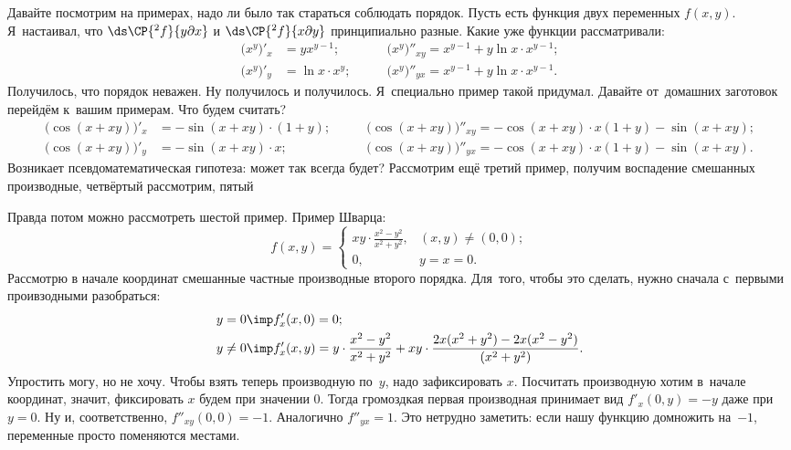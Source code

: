 \documentclass[a4paper,10pt,twoside]{article}
\begin{document}
	 Давайте посмотрим на примерах, надо ли было так стараться соблюдать порядок. Пусть есть функция двух переменных $f(x,y)$. Я~настаивал, что
	 $\ds\CP{^2f}{y\partial x}$ и $\ds\CP{^2f}{x\partial y}$ принципиально разные. Какие уже функции рассматривали:
	 \begin{align*}\big(x^y\big)'_x &= yx^{y-1};\qquad &\big(x^y\big)''_{xy} = x^{y-1} + y\ln x\cdot x^{y-1}; \\
	 \big(x^y\big)'_{y} &= \ln x\cdot x^y;\qquad &\big(x^y\big)''_{yx} = x^{y-1} + y\ln x\cdot x^{y-1}.
	 \end{align*}
	 Получилось, что порядок неважен. Ну получилось и получилось. Я~специально пример такой придумал. Давайте от~домашних
	 заготовок перейдём к~вашим примерам. Что будем считать?
	 \begin{align*}
	 \big(\cos(x+xy)\big)'_x &=-\sin(x+xy)\cdot(1+y);\qquad &\big(\cos(x+xy)\big)''_{xy} = -\cos(x+xy)\cdot x(1+y) - \sin (x+xy);\\
	 \big(\cos(x+xy)\big)'_y &=-\sin(x+xy)\cdot x;\qquad &\big(\cos(x+xy)\big)''_{yx} = -\cos(x+xy)\cdot x(1+y) - \sin (x+xy).
	 \end{align*}
	 Возникает псевдоматематическая гипотеза: может так всегда будет? Рассмотрим ещё третий пример, получим воспадение смешанных производные, четвёртый рассмотрим, пятый\ldotst{}
	 
	 Правда потом можно рассмотреть шестой пример. Пример Шварца:
	 \[f(x,y) = \begin{cases}
	 xy\cdot\frac{x^2-y^2}{x^2+y^2},&(x,y)\neq(0,0);\\
	 0,&y=x=0.
	 \end{cases}\]
	 Рассмотрю в начале координат смешанные частные производные второго порядка. Для~того, чтобы это сделать, нужно сначала с~первыми проивзодными разобраться:
	 \begin{align*}
	 &y=0 \imp    f'_x(x,0) = 0; \\
	 &y\neq0 \imp f'_x(x,y) = y\cdot\frac{x^2 - y^2}{x^2+y^2} + xy\cdot\frac{2x(x^2+y^2) - 2x(x^2 - y^2)}{(x^2+y^2)}.
	 \end{align*}
	 Упростить могу, но не хочу. Чтобы взять теперь производную по~$y$, надо зафиксировать $x$. Посчитать производную хотим в~начале координат, значит,
	 фиксировать $x$ будем при значении $0$. Тогда громоздкая первая производная принимает вид $f'_x(0,y) = -y$ даже при~$y=0$.
	 Ну и, соответственно, $f''_{xy}(0,0) = -1$.
	 Аналогично $f''_{yx} = 1$. Это нетрудно заметить: если нашу функцию домножить на~$-1$, переменные просто поменяются местами.
	 
\end{document}
